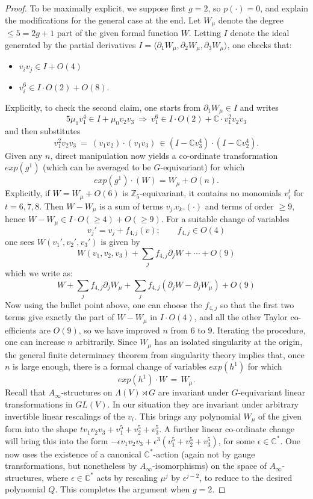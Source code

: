 \documentclass[reqno,10pt]{amsart}
\numberwithin{equation}{section}
\newcommand{\bC}{{\mathbb C}}
\newcommand{\bZ}{{\mathbb Z}}
\theoremstyle{remark}
\begin{document}
\begin{proof}
To be maximally explicit, we suppose first $g=2$, so $p(\cdot) = 0$, and explain the modifications for the general case at the end.   Let $W_{\mu}$ denote the degree $\leq 5=2g+1$ part of the given formal function $W$.   Letting $I$ denote the ideal generated by the partial derivatives $I = \langle \partial_1 W_{\mu}, \partial _2W_{\mu}, \partial_3W_{\mu}\rangle$, one checks that:
\begin{itemize}
\item $v_iv_j \in I + O(4)$ 
\item  $v_i^{6} \in I\cdot O(2) + O(8)$.
\end{itemize}
Explicitly, to check the second claim, one starts from $\partial_1 W_{\mu} \in I$ and writes
\[
5 \mu_1 v_1^4  \in I + \mu_0 v_2v_3 \ \Rightarrow \ v_1^6 \in I\cdot O(2) + \bC\cdot v_1^2v_2v_3
\]
and then substitutes 
\[
v_1^2v_2v_3 \ = \ (v_1v_2)\cdot (v_1v_3)  \, \in (I - \bC v_3^4)\cdot (I - \bC v_2^4).
\]
Given any $n$, direct manipulation now yields a co-ordinate transformation $exp(g^1)$ (which can be averaged to be $G$-equivariant) for which 
\[
exp(g^1)\cdot (W) = W_{\mu}+O(n).
\]
Explicitly, if $W = W_{\mu} + O(6)$ is $\bZ_5$-equivariant, it contains no monomials $v_i^t$ for $t=6,7,8$.  Then $W-W_{\mu}$ is a sum of terms $v_j.v_k.(\cdot)$ and terms of order $\geq 9$, hence $W-W_{\mu} \in I\cdot O(\geq 4) + O(\geq 9)$.  For a suitable change of variables
\[
v_j' = v_j + f_{4,j}(v); \qquad f_{4,j} \in O(4)
\]
one sees $W(v_1',v_2',v_3')$ is given by
\[
W(v_1,v_2,v_3) + \sum_j f_{4,j} \partial_j W + \cdots + O(9)
\]
which we write as:
\[
W + \sum_j f_{4,j} \partial_j W_{\mu} + \sum_j f_{4,j} (\partial_j W - \partial_j W_{\mu}) +O(9)
\]
Now using the bullet point above, one can choose the $f_{4,j}$ so that the first two terms give exactly the part of $W-W_{\mu}$ in $I\cdot O(4)$, and all the other Taylor co-efficients are $O(9)$, so we have improved $n$ from $6$ to $9$.  Iterating the procedure, one can increase $n$ arbitrarily.   Since $W_{\mu}$ has an isolated singularity at the origin, the general finite determinacy theorem from singularity theory  \cite{MatherYau} implies that, once $n$ is large enough, there is a formal change of variables $exp(h^1)$ for which
\[
exp(h^1)\cdot W \, = \, W_{\mu}.
\]
Recall that  $A_{\infty}$-structures on $\Lambda(V)\rtimes G$ are invariant under $G$-equivariant linear transformations in $GL(V)$. In our situation they are invariant under arbitrary invertible linear rescalings of the $v_i$. This brings any polynomial $W_{\mu}$ of the given form into the shape $tv_1v_2v_3 + v_1^5+v_2^5+v_3^5$. A further linear co-ordinate change will bring this into the form $-\epsilon v_1v_2v_3 + \epsilon^3(v_1^5+v_2^5+v_3^5)$, for some $\epsilon \in \bC^*$.  One now uses the existence of a canonical $\bC^*$-action (again not by gauge transformations, but nonetheless by $A_{\infty}$-isomorphisms) on the space of $A_{\infty}$-structures, where $\epsilon \in \bC^*$ acts by rescaling $\mu^j$ by $\epsilon^{j-2}$, to reduce to the desired polynomial $Q$.  This completes the argument when $g=2$.


\end{proof}
\end{document}
